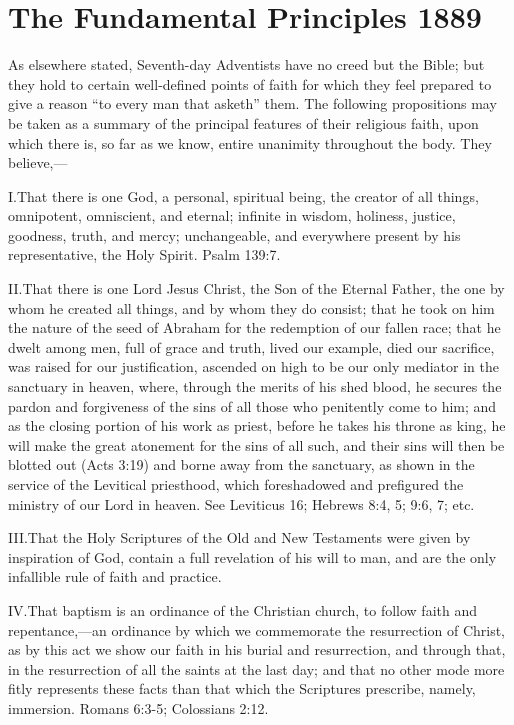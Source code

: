  \label{chap:appendix}

\section*{The Fundamental Principles 1889}

As elsewhere stated, Seventh-day Adventists have no creed but the Bible; but they hold to certain well-defined points of faith for which they feel prepared to give a reason “to every man that asketh” them. The following propositions may be taken as a summary of the principal features of their religious faith, upon which there is, so far as we know, entire unanimity throughout the body. They believe,— 

\lettrine{I.} That there is one God, a personal, spiritual being, the creator of all things, omnipotent, omniscient, and eternal; infinite in wisdom, holiness, justice, goodness, truth, and mercy; unchangeable, and everywhere present by his representative, the Holy Spirit. Psalm 139:7.

\lettrine{II.} That there is one Lord Jesus Christ, the Son of the Eternal Father, the one by whom he created all things, and by whom they do consist; that he took on him the nature of the seed of Abraham for the redemption of our fallen race; that he dwelt among men, full of grace and truth, lived our example, died our sacrifice, was raised for our justification, ascended on high to be our only mediator in the sanctuary in heaven, where, through the merits of his shed blood, he secures the pardon and forgiveness of the sins of all those who penitently come to him; and as the closing portion of his work as priest, before he takes his throne as king, he will make the great atonement for the sins of all such, and their sins will then be blotted out (Acts 3:19) and borne away from the sanctuary, as shown in the service of the Levitical priesthood, which foreshadowed and prefigured the ministry of our Lord in heaven. See Leviticus 16; Hebrews 8:4, 5; 9:6, 7; etc.

\lettrine{III.} That the Holy Scriptures of the Old and New Testaments were given by inspiration of God, contain a full revelation of his will to man, and are the only infallible rule of faith and practice.

\lettrine{IV.} That baptism is an ordinance of the Christian church, to follow faith and repentance,—an ordinance by which we commemorate the resurrection of Christ, as by this act we show our faith in his burial and resurrection, and through that, in the resurrection of all the saints at the last day; and that no other mode more fitly represents these facts than that which the Scriptures prescribe, namely, immersion. Romans 6:3-5; Colossians 2:12.

